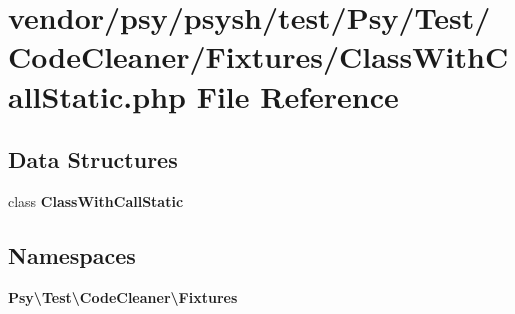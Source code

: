 \section{vendor/psy/psysh/test/\+Psy/\+Test/\+Code\+Cleaner/\+Fixtures/\+Class\+With\+Call\+Static.php File Reference}
\label{_class_with_call_static_8php}
\subsection*{Data Structures}
\begin{DoxyCompactItemize}
\item 
class {\bf Class\+With\+Call\+Static}
\end{DoxyCompactItemize}
\subsection*{Namespaces}
\begin{DoxyCompactItemize}
\item 
 {\bf Psy\textbackslash{}\+Test\textbackslash{}\+Code\+Cleaner\textbackslash{}\+Fixtures}
\end{DoxyCompactItemize}

